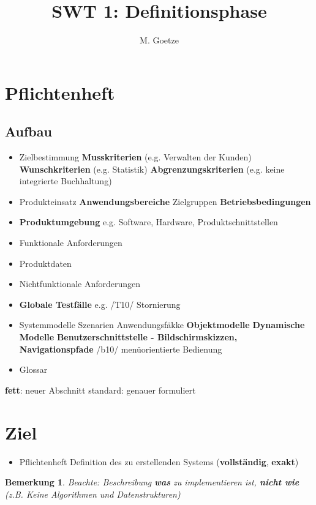 \documentclass[a4paper]{article}
\title{SWT 1: Definitionsphase}
\author{M. Goetze}
\theoremstyle{break}
\newtheorem{ann}{Bemerkung}[section]
\begin{document}
	\maketitle
	\tableofcontents
	\newpage
\section{Pflichtenheft}
\subsection{Aufbau}
	\begin{itemize}
		\item Zielbestimmung
		\subitem \textbf{Musskriterien} (e.g. Verwalten der Kunden)
		\subitem \textbf{Wunschkriterien} (e.g. Statistik)
		\subitem \textbf{Abgrenzungskriterien} (e.g. keine integrierte Buchhaltung)
		\item Produkteinsatz
		\subitem \textbf{Anwendungsbereiche}
		\subitem Zielgruppen
		\subitem \textbf{Betriebsbedingungen}
		\item \textbf{Produktumgebung}
		\subitem e.g. Software, Hardware, Produktschnittstellen
		\item Funktionale Anforderungen
		\item Produktdaten
		\item Nichtfunktionale Anforderungen
		\item \textbf{Globale Testfälle}
		\subitem e.g. /T10/ Stornierung
		\item Systemmodelle
		\subitem Szenarien
		\subitem Anwendungsfäkke
		\subitem \textbf{Objektmodelle}
		\subitem \textbf{Dynamische Modelle}
		\subitem \textbf{Benutzerschnittstelle - Bildschirmskizzen, Navigationspfade}
		\subitem /b10/ menüorientierte Bedienung
		\item Glossar
	\end{itemize}

	\textbf{fett}: neuer Abschnitt
	standard: genauer formuliert
\section{Ziel}
\begin{itemize}
	\item Pflichtenheft
	\subitem Definition des zu erstellenden Systems (\textbf{vollständig}, \textbf{exakt})
\end{itemize}
\begin{ann}
	Beachte: Beschreibung \textbf{was} zu implementieren ist, \textbf{nicht wie} (z.B. Keine Algorithmen und Datenstrukturen)
\end{ann}
\end{document}
